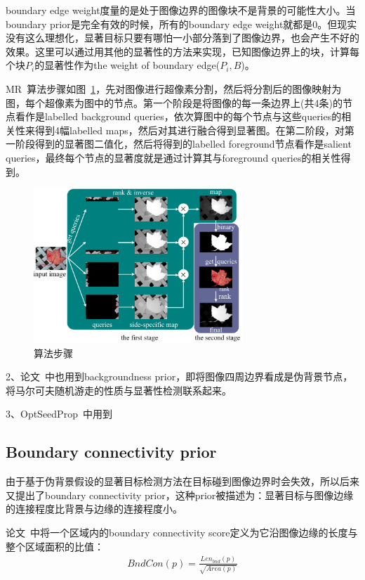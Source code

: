 \documentclass[12pt]{article}
\begin{document}
boundary edge weight度量的是处于图像边界的图像块不是背景的可能性大小。当boundary prior是完全有效的时候，所有的boundary edge weight就都是0。但现实没有这么理想化，显著目标只要有哪怕一小部分落到了图像边界，也会产生不好的效果。这里可以通过用其他的显著性的方法来实现，已知图像边界上的块，计算每个块$P_i$的显著性作为the weight of boundary edge($P_i, B$)。

MR~\cite{yang2013saliency}算法步骤如图~\ref{fig: MR1}，先对图像进行超像素分割，然后将分割后的图像映射为图，每个超像素为图中的节点。第一个阶段是将图像的每一条边界上(共4条)的节点看作是labelled background queries，依次算图中的每个节点与这些queries的相关性来得到4幅labelled maps，然后对其进行融合得到显著图。在第二阶段，对第一阶段得到的显著图二值化，然后将得到的labelled foreground节点看作是salient queries，最终每个节点的显著度就是通过计算其与foreground queries的相关性得到。
\begin{figure}[!ht]
\centering
\includegraphics[width=0.7\textwidth]{MR1.png}
\caption{算法步骤}
\label{fig: MR1}
\end{figure}

2、论文~\cite{jiang2013saliency}中也用到backgroundness prior，即将图像四周边界看成是伪背景节点，将马尔可夫随机游走的性质与显著性检测联系起来。

3、OptSeedProp~\cite{lu2014learning}中用到

\subsection{Boundary connectivity prior}

由于基于伪背景假设的显著目标检测方法在目标碰到图像边界时会失效，所以后来又提出了boundary connectivity prior，这种prior被描述为：显著目标与图像边缘的连接程度比背景与边缘的连接程度小。

论文~\cite{zhu2014saliency}中将一个区域内的boundary connectivity score定义为它沿图像边缘的长度与整个区域面积的比值：
\begin{align}
BndCon(p) = \frac{Len_{bnd}(p)}{\sqrt{Area(p)}}
\end{align}
\end{document}

